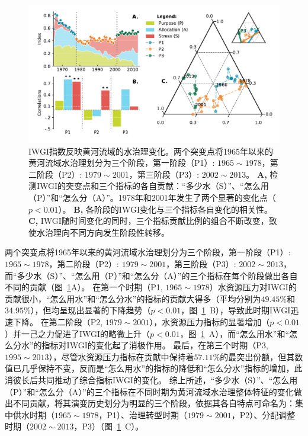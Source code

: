 
\begin{figure}[ht!]
	\centering
	\includegraphics[width=\textwidth]{img/ch4/index.pdf}
	\caption[IWGI指数反映黄河流域的水治理变化]{IWGI指数反映黄河流域的水治理变化。两个突变点将1965年以来的黄河流域水治理划分为三个阶段，第一阶段（P1）: $1965 \sim 1978$，第二阶段（P2）: $1979 \sim 2001$，第三阶段（P3）: $2002 \sim 2013$。
	\textbf{A,} 检测IWGI的突变点和三个指标的各自贡献：“多少水（S）”、“怎么用（P）”和“怎么分（A）”。1978年和2001年发生了两个显著的变化点（$p<0.01$）。
	\textbf{B,}  各阶段的IWGI变化与三个指标各自变化的相关性。
	\textbf{C,} IWGI随时间变化的同时，三个指标贡献比例的组合不断改变，致使水治理向不同方向发生阶段性转移。
	}\label{ch4:fig:IWGI}
\end{figure}

两个突变点将1965年以来的黄河流域水治理划分为三个阶段，第一阶段（P1）: $1965 \sim 1978$，第二阶段（P2）: $1979 \sim 2001$，第三阶段（P3）: $2002 \sim 2013$，而“多少水（S）”、“怎么用（P）”和“怎么分（A）”的三个指标在每个阶段做出各自不同的贡献（图~\ref{ch4:fig:IWGI}A）。
在第一个时期（P1, $1965 \sim 1978$）水资源压力对IWGI的贡献很小，“怎么用水”和“怎么分水”的指标的贡献大得多（平均分别为$49.45\%$和$34.95\%$），但均呈现出显著的下降趋势（$p<0.01$，图~\ref{ch4:fig:IWGI}~B），导致此时期IWGI迅速下降。
在第二阶段（P2, $1979 \sim 2001$），水资源压力指标的显著增加（$p<0.01$）并一己之力促进了IWGI的略微上升（$p<0.01$，图~\ref{ch4:fig:IWGI}~A），而“怎么用水”和“怎么分水”的指标对IWGI的变化起了消极作用。
最后，在第三个时期（P3, $1995 \sim 2013$），尽管水资源压力指标在贡献中保持着$57.11\%$的最突出份额，但其数值已几乎保持不变，反而是“怎么用水”的指标的降低和“怎么分水”指标的增加，此消彼长后共同推动了综合指标IWGI的变化。
综上所述，“多少水（S）”、“怎么用（P）”和“怎么分（A）”的三个指标在不同时期为黄河流域水治理整体特征的变化做出不同贡献，将其演变历史划分为明显的三个阶段，依据其各自特点可命名为：集中供水时期（$1965 \sim 1978$，P1）、治理转型时期（$1979 \sim 2001$，P2）、分配调整时期（$2002 \sim 2013$，P3）（图~\ref{ch4:fig:IWGI}~C）。
